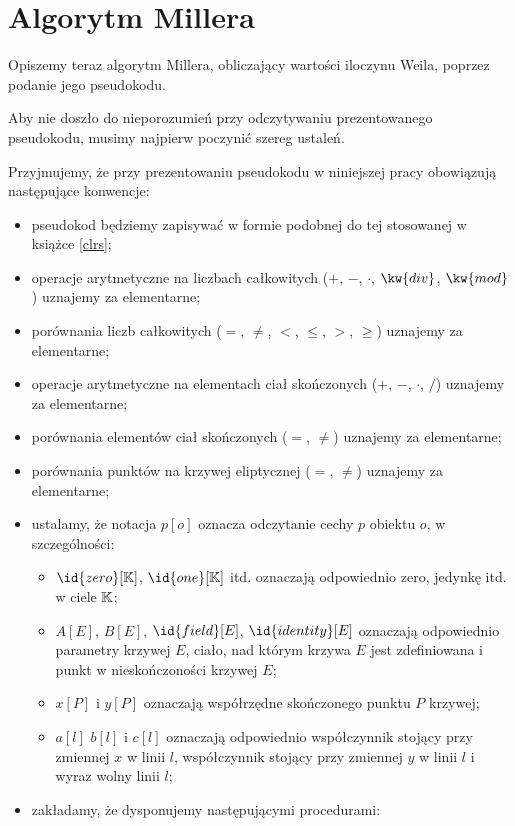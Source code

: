 \section{Algorytm Millera}

Opiszemy teraz algorytm Millera,
obliczający wartości iloczynu Weila,
poprzez podanie jego pseudokodu.

Aby nie doszło do nieporozumień przy odczytywaniu
prezentowanego pseudokodu,
musimy najpierw poczynić szereg ustaleń.

\begin{remark}
Przyjmujemy, że przy prezentowaniu pseudokodu w niniejszej pracy
obowiązują następujące konwencje:
\begin{itemize}
\item pseudokod będziemy zapisywać w formie podobnej do tej
stosowanej w książce \ref{clrs};
\item operacje arytmetyczne na liczbach całkowitych
($+$, $-$, $\cdot$, $\kw{div}$, $\kw{mod}$)
uznajemy za elementarne;
\item porównania liczb całkowitych
($=$, $\neq$, $<$, $\leq$, $>$, $\geq$)
uznajemy za elementarne;
\item operacje arytmetyczne na elementach ciał skończonych
($+$, $-$, $\cdot$, $/$)
uznajemy za elementarne;
\item porównania elementów ciał skończonych
($=$, $\neq$)
uznajemy za elementarne;
\item porównania punktów na krzywej eliptycznej
($=$, $\neq$)
uznajemy za elementarne;
\item ustalamy, że notacja $p[o]$ oznacza odczytanie cechy $p$ obiektu $o$,
w szczególności:
\begin{itemize}
\item $\id{zero}[\K]$, $\id{one}[\K]$ itd.
oznaczają odpowiednio
zero, jedynkę itd. w ciele $\mathbb{K}$;
\item $A[E]$, $B[E]$, $\id{field}[E]$, $\id{identity}[E]$
oznaczają odpowiednio
parametry krzywej $E$, ciało, nad którym krzywa $E$ jest zdefiniowana
i punkt w nieskończoności krzywej $E$;
\item $x[P]$ i $y[P]$ oznaczają współrzędne skończonego punktu $P$ krzywej;
\item $a[l]$ $b[l]$ i $c[l]$ oznaczają odpowiednio
współczynnik stojący przy zmiennej $x$ w linii $l$,
współczynnik stojący przy zmiennej $y$ w linii $l$
i wyraz wolny linii $l$;
\end{itemize}
\item zakładamy, że dysponujemy następującymi procedurami:

\end{itemize}
\end{remark}

